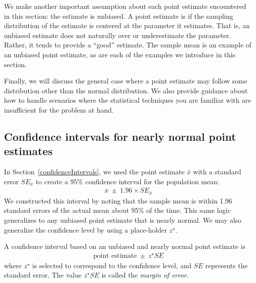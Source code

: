 We make another important assumption about each point estimate encountered in this section: the estimate is unbiased. A point estimate is  if the sampling distribution of the estimate is centered at the parameter it estimates. That is, an unbiased estimate does not naturally over or underestimate the parameter. Rather, it tends to provide a ``good'' estimate. The sample mean is an example of an unbiased point estimate, as are each of the examples we introduce in this section.

Finally, we will discuss the general case where a point estimate may follow some distribution other than the normal distribution. We also provide guidance about how to handle scenarios where the statistical techniques you are familiar with are insufficient for the problem at hand.


\subsection{Confidence intervals for nearly normal point estimates}


In Section~\ref{confidenceIntervals}, we used the point estimate $\bar{x}$ with a standard error $SE_{\bar{x}}$ to create a 95\% confidence interval for the population mean:
\begin{align}
\bar{x}\ \pm\ 1.96 \times SE_{\bar{x}}
\label{95PercCIForMeanInGeneralizingSection}
\end{align}
We constructed this interval by noting that the sample mean is within 1.96 standard errors of the actual mean about 95\% of the time. This same logic generalizes to any unbiased point estimate that is nearly normal. We may also generalize the confidence level by using a place-holder $z^{\star}$.

\begin{termBox}{\label{generalConfidenceIntervalTermBox}%
A confidence interval based on an unbiased and nearly normal point estimate is
\begin{eqnarray}
\text{point estimate}\ \pm\ z^{\star}SE
\label{95PercGeneralCIInGeneralizingSection}
\end{eqnarray}
where $z^{\star}$ is selected to correspond to the confidence level, and $SE$ represents the standard error. The value $z^{\star}SE$ is called the \emph{margin of error}.}
\end{termBox}

